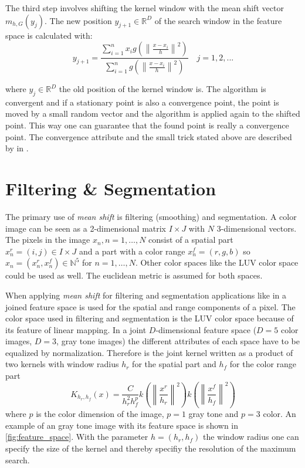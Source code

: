 The third step involves shifting the kernel window with the mean shift vector 
$m_{h,G}(y_j)$. The new position $y_{j+1} \in \mathbb{R}^D$ of the search window 
in the feature space is calculated with:
\begin{equation}\label{eq:msproc}
 	y_{j+1} = 
	\frac{\sum_{i=1}^n x_i g\left(\left\lVert \frac{x - x_i}{h}
	\right\rVert^2\right)}{\sum_{i=1}^n g\left(\left\lVert \frac{x - x_i}{h}
	\right\rVert^2\right)} \quad j = 1,2,...
\end{equation}


where $y_j \in \mathbb{R}^D$ the old position of the kernel window is. The 
algorithm is convergent and if a stationary point is also a convergence point,
the point is moved by a small random vector and the algorithm is applied again
to the shifted point. This way one can guarantee that the found point is really
a convergence point. The convergence attribute and the small trick stated above
are described by \citeauthor{citeulike:462300} in \citep{citeulike:462300}.


\section{Filtering {\upshape\&} Segmentation} %
\label{sec:filtering_segmentation}
The primary use of \emph{mean shift} is filtering (smoothing) and segmentation. 
A color image can be seen as a 2-dimensional matrix $I \times J$ with $N$ 
3-dimensional vectors. The pixels in the image $x_n, n = 1, \ldots , N$ consist of
a spatial part $x_n^r = (i,j) \in I \times J$ and a part with a color range
$x_n^f = (r,g,b)$ so $x_n = (x_n^r, x_n^f) \in \mathbb{N}^5$ for $n = 1, \ldots , N$.
Other color spaces like the \gls{LUV} color space could be used as well. The 
euclidean metric is assumed for both spaces. 

When applying \emph{mean shift} for filtering and segmentation applications
like in \citeauthor{citeulike:462300} \citep{citeulike:462300} a joined feature
space is used for the spatial and range components of a pixel. The color space
used in filtering and segmentation is the \gls{LUV} color space because of its
feature of linear mapping. In a joint $D$-dimensional feature space ($D=5$ color
images, $D=3$, gray tone images) the different attributes of each space have to be
equalized by normalization. Therefore is the joint kernel written as a product of
two kernels with window radius $h_r$ for the spatial part and $h_f$ for the 
color range part
\begin{equation}\label{eq:jokernel}
	K_{h_r, h_f}(x) = \frac{C}{h_r^2h_f^p}
	k \left( \left\lVert \frac{x^r}{h_r} \right\rVert^2\right) 
	k \left( \left\lVert \frac{x^f}{h_f} \right\rVert^2\right) 
\end{equation}
where $p$ is the color dimension of the image, $p=1$ gray tone and $p=3$ color. 
An example of an gray tone image with its feature space is shown in 
\autoref{fig:feature_space}. With the parameter $h = (h_r, h_f)$ the window
radius one can specify the size of the kernel and thereby specifiy the resolution
of the maximum search.

